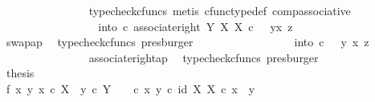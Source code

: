 \begin{isabellebody}
\ \ \ \ \ \ \ \ \ \ \ \ \ \ \isamarkupfalse%
\ {\isacharparenleft}{\kern0pt}typecheck{\isacharunderscore}{\kern0pt}cfuncs{\isacharcomma}{\kern0pt}\ metis\ cfunc{\isacharunderscore}{\kern0pt}type{\isacharunderscore}{\kern0pt}def\ comp{\isacharunderscore}{\kern0pt}associative{\isacharparenright}{\kern0pt}\isanewline
\ \ \ \ \ \ \ \ \ \ \ \ \isamarkupfalse%
\ \isamarkupfalse%
\ {\isachardoublequoteopen}{\isachardot}{\kern0pt}{\isachardot}{\kern0pt}{\isachardot}{\kern0pt}\ {\isacharequal}{\kern0pt}\ into\ {\isasymcirc}\isactrlsub c\ associate{\isacharunderscore}{\kern0pt}right\ Y\ X\ X\ {\isasymcirc}\isactrlsub c\ \ \ {\isasymlangle}{\isasymlangle}y{\isacharcomma}{\kern0pt}x{\isasymrangle}{\isacharcomma}{\kern0pt}\ z{\isasymrangle}{\isachardoublequoteclose}\isanewline
\ \ \ \ \ \ \ \ \ \ \ \ \ \ \isamarkupfalse%
\ swap{\isacharunderscore}{\kern0pt}ap\ \isamarkupfalse%
\ {\isacharparenleft}{\kern0pt}typecheck{\isacharunderscore}{\kern0pt}cfuncs{\isacharcomma}{\kern0pt}\ presburger{\isacharparenright}{\kern0pt}\isanewline
\ \ \ \ \ \ \ \ \ \ \ \ \isamarkupfalse%
\ \isamarkupfalse%
\ {\isachardoublequoteopen}{\isachardot}{\kern0pt}{\isachardot}{\kern0pt}{\isachardot}{\kern0pt}\ {\isacharequal}{\kern0pt}\ into\ {\isasymcirc}\isactrlsub c\ \ \ {\isasymlangle}y{\isacharcomma}{\kern0pt}\ {\isasymlangle}x{\isacharcomma}{\kern0pt}\ z{\isasymrangle}{\isasymrangle}{\isachardoublequoteclose}\isanewline
\ \ \ \ \ \ \ \ \ \ \ \ \ \ \isamarkupfalse%
\ associate{\isacharunderscore}{\kern0pt}right{\isacharunderscore}{\kern0pt}ap\ \isamarkupfalse%
\ {\isacharparenleft}{\kern0pt}typecheck{\isacharunderscore}{\kern0pt}cfuncs{\isacharcomma}{\kern0pt}\ presburger{\isacharparenright}{\kern0pt}\isanewline
\ \ \ \ \ \ \ \ \ \ \ \ \isamarkupfalse%
\ \isamarkupfalse%
\ {\isacharquery}{\kern0pt}thesis\isacommand{{\isachardot}{\kern0pt}}\isamarkupfalse%
\isanewline
\ \ \ \ \ \ \ \ \ \ \isamarkupfalse%
\isanewline
\ \ \ \ \ \ \ \ \isamarkupfalse%
\isanewline
\ \ \isanewline
\ \ \ \ \ \ \ \ \isamarkupfalse%
\ f{}{\isacharcolon}{\kern0pt}\ {\isachardoublequoteopen}{\isasymAnd}x\ y{\isachardot}{\kern0pt}\ x\ {\isasymin}\isactrlsub c\ X\ {\isasymLongrightarrow}\ y\ {\isasymin}\isactrlsub c\ Y\ \ {\isasymLongrightarrow}\ {\isacharparenleft}{\kern0pt}{\isasymTheta}\ {\isasymcirc}\isactrlsub c\ {\isasymlangle}x{\isacharcomma}{\kern0pt}\ y{\isasymrangle}{\isacharparenright}{\kern0pt}\isactrlsup {\isasymflat}\ {\isasymcirc}\isactrlsub c\ {\isasymlangle}id\ X{\isacharcomma}{\kern0pt}\ {\isasymbeta}\isactrlbsub X\isactrlesub {\isasymrangle}\ {\isasymcirc}\isactrlsub c\ x\ {\isacharequal}{\kern0pt}\ y{\isachardoublequoteclose}\isanewline

\end{isabellebody}
